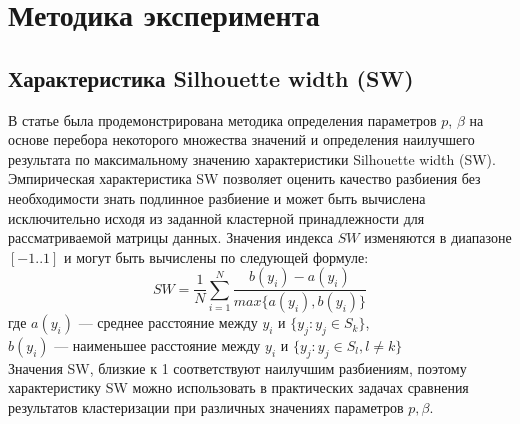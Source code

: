 \documentclass[12pt,twoside,a4paper,tikz,border=5]{refart}
\begin{document}
	\section{Методика эксперимента}
		\subsection{Характеристика Silhouette width (SW)}
		В статье \cite{choose-pb} была продемонстрирована методика определения параметров $ p $, $ \beta $ на основе перебора некоторого множества значений и определения наилучшего результата по максимальному значению характеристики Silhouette width (SW). Эмпирическая характеристика SW позволяет оценить качество разбиения без необходимости знать подлинное разбиение и может быть вычислена исключительно исходя из заданной кластерной принадлежности для рассматриваемой матрицы данных. Значения индекса $ SW $ изменяются в диапазоне $ [-1..1] $ и могут быть вычислены по следующей формуле:
		\begin{equation}
			SW = \dfrac{1}{N}\sum_{i=1}^{N}\dfrac{b(y_i)-a(y_i)}{max\{a(y_i),b(y_i)\}}
		\end{equation}
		\noindent где $ a(y_i) $ --- среднее расстояние между $ y_i $ и $ \{y_j:y_j \in S_k\} $,\\
		\phantom{где\space}$b(y_i)$ --- наименьшее расстояние между $ y_i $ и $ \{y_j:y_j \in S_l, l\neq k \} $\\
		
		Значения  SW, близкие к 1 соответствуют наилучшим разбиениям, поэтому характеристику SW можно использовать в практических задачах сравнения результатов кластеризации при различных значениях параметров $ p,\beta $.
		
		
		
\end{document}
